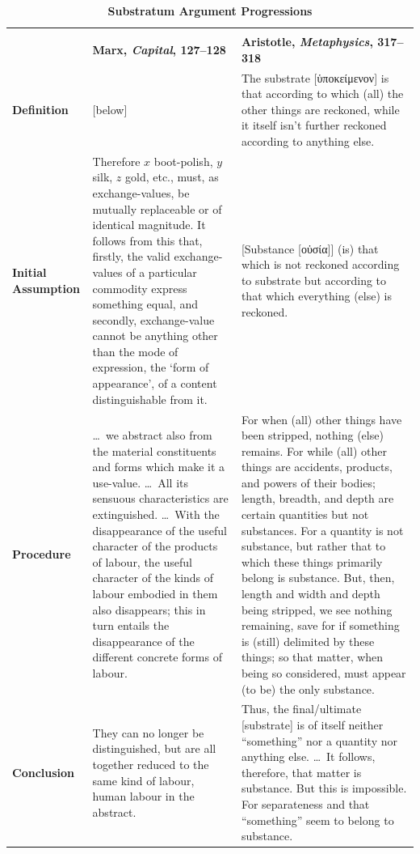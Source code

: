 \documentclass[12pt]{article}
\begin{document}
\begin{singlespacing}
\begin{table}[htbp]
\centering
\caption{\textbf{Substratum Argument Progressions}}
\footnotesize
\begin{tabularx}{\textwidth}{l|X|X}
\multicolumn{3}{c}{} \\
& \textbf{Marx, \textit{Capital}, 127--128} & \textbf{Aristotle, \textit{Metaphysics}, 317--318} \\
\hline
\textbf{Definition} & [below] & The substrate [\foreignlanguage{greek}{ὑποκείμενον}] is that according to which (all) the other things are reckoned, while it itself isn't further reckoned according to anything else. \\
\hline
\textbf{Initial Assumption} & Therefore $x$ boot-polish, $y$ silk, $z$ gold, etc., must, as exchange-values, be mutually replaceable or of identical magnitude. It follows from this that, firstly, the valid exchange-values of a particular commodity express something equal, and secondly, exchange-value cannot be anything other than the mode of expression, the `form of appearance', of a content distinguishable from it. & [Substance [\foreignlanguage{greek}{οὐσία}]] (is) that which is not reckoned according to substrate but according to that which everything (else) is reckoned. \\
\hline
\textbf{Procedure} & \dots\ we abstract also from the material constituents and forms which make it a use-value. \dots\ All its sensuous characteristics are extinguished. \dots\ With the disappearance of the useful character of the products of labour, the useful character of the kinds of labour embodied in them also disappears; this in turn entails the disappearance of the different concrete forms of labour. & For when (all) other things have been stripped, nothing (else) remains. For while (all) other things are accidents, products, and powers of their bodies; length, breadth, and depth are certain quantities but not substances. For a quantity is not substance, but rather that to which these things primarily belong is substance. But, then, length and width and depth being stripped, we see nothing remaining, save for if something is (still) delimited by these things; so that matter, when being so considered, must appear (to be) the only substance. \\
\hline
\textbf{Conclusion} & They can no longer be distinguished, but are all together reduced to the same kind of labour, human labour in the abstract. & Thus, the final/ultimate [substrate] is of itself neither ``something'' nor a quantity nor anything else. \dots\ It follows, therefore, that matter is substance. But this is impossible. For separateness and that ``something'' seem to belong to substance. \\

\end{tabularx}
\end{table}
\end{singlespacing}
\end{document}
